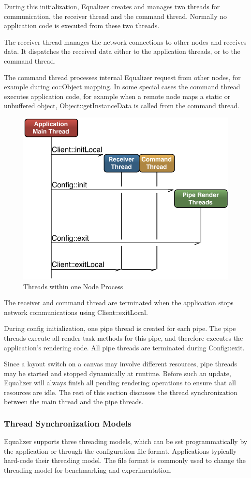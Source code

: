 \documentclass[10pt,a4]{scrartcl}
\begin{document}
During this initialization, Equalizer creates and manages two threads
for communication, the receiver thread and the command thread. Normally
no application code is executed from these two threads.

The receiver thread manages the network connections to other nodes and
receives data. It dispatches the received data either to the application
threads, or to the command thread.

The command thread processes internal Equalizer request from other
nodes, for example during \textsf{co::Object} mapping. In some
special cases the command thread executes application code, for example
when a remote node maps a static or unbuffered object,
\textsf{Object::getInstanceData} is called from the command thread.

\begin{figure}
  \includegraphics[width=.618\textwidth]{images/threads.pdf}
  {\caption{\label{fThreads}Threads within one Node Process}}
\end{figure}
The receiver and command thread are terminated when the application
stops network communications using \textsf{Client::exitLocal}.

During config initialization, one pipe thread is created for each pipe. The pipe
threads execute all render task methods for this pipe, and therefore executes
the application's rendering code. All pipe threads are terminated during
\textsf{Config::exit}.

Since a layout switch on a canvas may involve different resources, pipe threads
may be started and stopped dynamically at runtime. Before such an update,
Equalizer will always finish all pending rendering operations to ensure that all
resources are idle. The rest of this section discusses the thread
synchronization between the main thread and the pipe threads.


\subsubsection{\label{sThreadModel}Thread Synchronization Models}
Equalizer supports three threading models, which can be set
programmatically by the application or through the configuration file
format. Applications typically hard-code their threading model. The file
format is commonly used to change the threading model for benchmarking
and experimentation.
\end{document}
